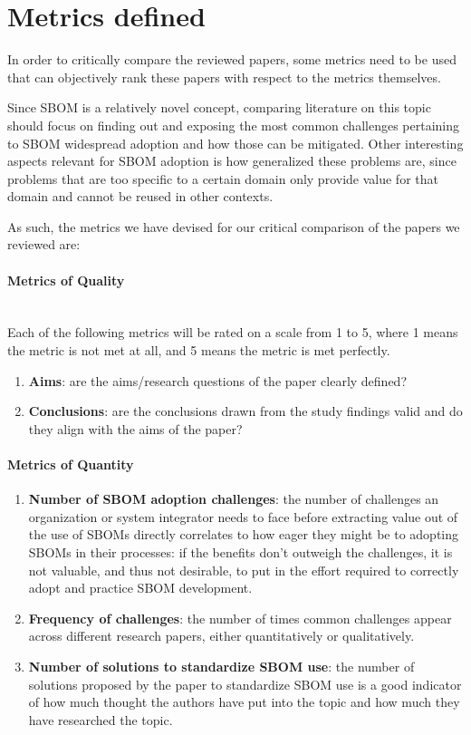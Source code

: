 \section{Metrics defined} \label{metrics}

In order to critically compare the reviewed papers, some metrics need to be used that can objectively rank these papers with respect to the metrics themselves.

\noindent Since SBOM is a relatively novel concept, comparing literature on this topic should focus on finding out and exposing the most common challenges pertaining to SBOM widespread adoption and how those can be mitigated. Other interesting aspects relevant for SBOM adoption is how generalized these problems are, since problems that are too specific to a certain domain only provide value for that domain and cannot be reused in other contexts.

\noindent As such, the metrics we have devised for our critical comparison of the papers we reviewed are:

\paragraph{Metrics of Quality}\mbox{}\\
Each of the following metrics will be rated on a scale from 1 to 5, where 1 means the metric is not met at all, and 5 means the metric is met perfectly.
\begin{enumerate}
    \item \textbf{Aims}: are the aims/research questions of the paper clearly defined?
    \item \textbf{Conclusions}: are the conclusions drawn from the study findings valid and do they align with the aims of the paper?
\end{enumerate}

\paragraph{Metrics of Quantity}
\begin{enumerate}
    \item \textbf{Number of SBOM adoption challenges}: the number of challenges an organization or system integrator needs to face before extracting value out of the use of SBOMs directly correlates to how eager they might be to adopting SBOMs in their processes: if the benefits don't outweigh the challenges, it is not valuable, and thus not desirable, to put in the effort required to correctly adopt and practice SBOM development.
    \item \textbf{Frequency of challenges}: the number of times common challenges appear across different research papers, either quantitatively or qualitatively.
    \item \textbf{Number of solutions to standardize SBOM use}: the number of solutions proposed by the paper to standardize SBOM use is a good indicator of how much thought the authors have put into the topic and how much they have researched the topic.
\end{enumerate}


